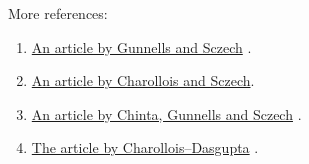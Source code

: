 \documentclass[11pt,a4paper,notitlepage]{article}
\begin{document}
More references:
\begin{enumerate}
\item \href{gunnells_sczech.pdf}{An article by Gunnells and Sczech} \cite{MR1980994}.
\item \href{Charollois-Sczech_EMS.pdf}{An article by Charollois and Sczech}\cite{MR3526308}. 
\item \href{0001011.pdf}{An article by Chinta, Gunnells and Sczech} \cite{MR1850609}.
\item \href{1206.3050.pdf}{The article by Charollois--Dasgupta} \cite{MR3272012}.
\end{enumerate}

	
	
\end{document}
